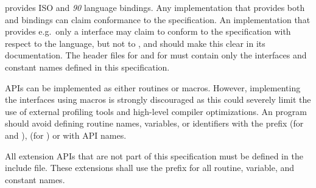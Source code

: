 \openshmem provides ISO \Clang{} and \Fortran{} \textit{90} language bindings.
Any implementation that provides both \Clang{} and \Fortran{} bindings can claim
conformance to the specification. An implementation that provides e.g.\ only a
\Clang{} interface may claim to conform to the \openshmem specification with
respect to the \Clang{} language, but not to \Fortran, and should make this
clear in its documentation. The \openshmem header files  for
\Clang{} and  for
\Fortran{} must contain only the interfaces and constant names defined in this
specification.

\openshmem \ac{API}s can be implemented as either routines or macros. However,
implementing the interfaces using macros is strongly discouraged as this could
severely limit the use of external profiling tools and high-level compiler
optimizations. An \openshmem program should avoid defining routine names,
variables, or identifiers with the prefix \shmemprefix (for \Clang{} and
\Fortran), \shmemprefixC (for \Clang) or with \openshmem \ac{API} names.

All \openshmem extension \ac{API}s that are not part of this specification must
be defined in the  include file. These extensions shall use the
 prefix for all routine, variable, and constant names.
